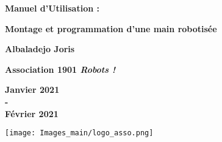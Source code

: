 \documentclass[12pt, a4paper]{article}
\numberwithin{figure}{section} %
\begin{document}
    \begin{titlepage}
         \begin{center}
            \Huge{\textbf{Manuel d'Utilisation :}}
            
            \Huge{\textbf{Montage et programmation d'une main robotisée}}
            
            \vspace{2cm}
                \LARGE{\textbf{Albaladejo Joris}}
                
                \vspace{2cm}
                \Large {\textbf{ Association 1901 \textit{Robots !}}}
                
                \vspace{1cm}
                \Large{\textbf{Janvier 2021\\
                -\\
                Février 2021\\
                }}
                
                \vspace{3cm}
                \texttt{[image: Images\_main/logo\_asso.png]}
        \end{center}
    \end{titlepage}


\newpage

\thispagestyle{empty}
        \tableofcontents
        
        \newpage
        \listoffigures
        





\newpage










\newpage


\end{document}
